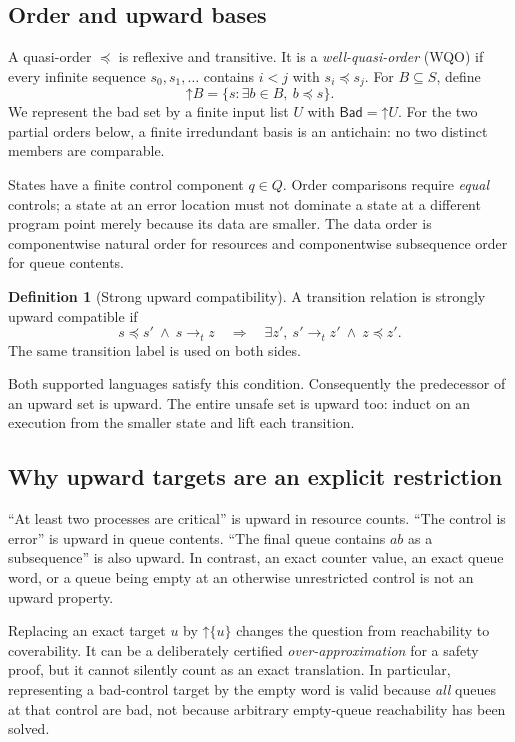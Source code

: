 \documentclass[11pt,a4paper]{article}
\theoremstyle{definition}
\newtheorem{definition}[theorem]{Definition}
\newcommand{\Up}[1]{\mathord{\uparrow}#1}
\newcommand{\Bad}{\mathsf{Bad}}
\begin{document}
\subsection{Order and upward bases}
A quasi-order $\preceq$ is reflexive and transitive. It is a
\emph{well-quasi-order} (WQO) if every infinite sequence $s_0,s_1,\ldots$
contains $i<j$ with $s_i\preceq s_j$. For $B\subseteq S$, define
\[
 \Up B=\{s:\exists b\in B,\ b\preceq s\}.
\]
We represent the bad set by a finite input list $U$ with
$\Bad=\Up U$. For the two partial orders below, a finite irredundant basis is
an antichain: no two distinct members are comparable.

States have a finite control component $q\in Q$. Order comparisons require
\emph{equal} controls; a state at an error location must not dominate a state
at a different program point merely because its data are smaller. The data
order is componentwise natural order for resources and componentwise
subsequence order for queue contents.

\begin{definition}[Strong upward compatibility]
A transition relation is strongly upward compatible if
\[
 s\preceq s'\ \wedge\ s\to_t z
 \quad\Longrightarrow\quad
 \exists z',\ s'\to_t z'\ \wedge\ z\preceq z'.
 \label{eq:monotone}
\]
The same transition label is used on both sides.
\end{definition}

Both supported languages satisfy this condition. Consequently the predecessor
of an upward set is upward. The entire unsafe set is upward too: induct on
an execution from the smaller state and lift each transition.

\subsection{Why upward targets are an explicit restriction}
``At least two processes are critical'' is upward in resource counts.
``The control is error'' is upward in queue contents. ``The final queue
contains $ab$ as a subsequence'' is also upward. In contrast, an exact counter
value, an exact queue word, or a queue being empty at an otherwise unrestricted
control is not an upward property.

Replacing an exact target $u$ by $\Up{\{u\}}$ changes the question from
reachability to coverability. It can be a deliberately certified
\emph{over-approximation} for a safety proof, but it cannot silently count as
an exact translation. In particular, representing a bad-control target by the
empty word is valid because \emph{all} queues at that control are bad, not
because arbitrary empty-queue reachability has been solved.
\end{document}
